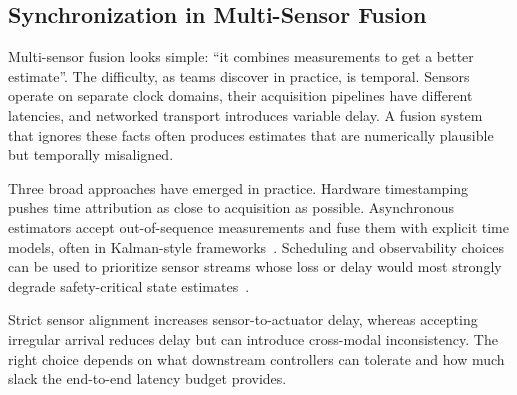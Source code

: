 \documentclass[smallextended]{svjour3}
\begin{document}
\subsection{Synchronization in Multi-Sensor Fusion}

Multi-sensor fusion looks simple: ``it combines measurements to get a better estimate''. The difficulty, as teams discover in practice, is temporal. Sensors operate on separate clock domains, their acquisition pipelines have different latencies, and networked transport introduces variable delay. A fusion system that ignores these facts often produces estimates that are numerically plausible but temporally misaligned.

Three broad approaches have emerged in practice. Hardware timestamping
pushes time attribution as close to acquisition as possible. Asynchronous estimators accept out-of-sequence measurements and fuse them with explicit time models, often in Kalman-style frameworks~\cite{thrun2005}. Scheduling and observability choices can be used to prioritize sensor streams whose loss or delay would most strongly degrade safety-critical
state estimates~\cite{niu2018sensor}.

Strict sensor alignment increases sensor-to-actuator delay, whereas accepting irregular arrival reduces delay but can introduce cross-modal inconsistency. The right choice depends on what downstream controllers can tolerate and how much slack the end-to-end latency budget provides.
\end{document}

